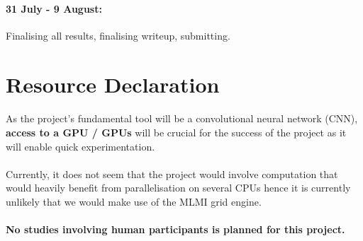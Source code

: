 \documentclass{article}
\begin{document}
\paragraph{31 July - 9 August: } Finalising all results, finalising writeup, submitting.
\section*{Resource Declaration}
\paragraph{}
As the project's fundamental tool will be a convolutional neural network (CNN),
\textbf{access to a GPU / GPUs} will be crucial for the success of the project as it will
enable quick experimentation.
\paragraph{}
Currently, it does not seem that the project would involve computation that would
heavily benefit from parallelisation on several CPUs hence it is currently unlikely that
we would make use of the MLMI grid engine.
\paragraph{}
\textbf{No studies involving human participants is planned for this project.}
\printbibliography
\end{document}
